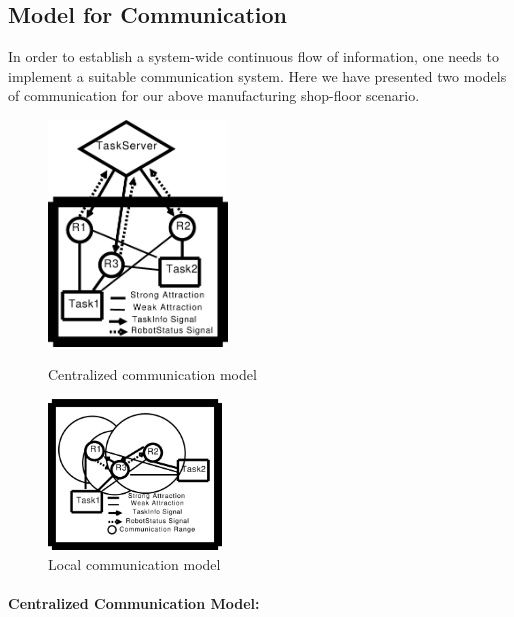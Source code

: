 \documentclass[a4paper, 10pt, conference]{ieeeconf}      %
\begin{document}
\subsection{Model for Communication}
In order to establish a system-wide continuous flow of information, one needs to implement a  suitable communication system. Here we have presented two models of communication for our above manufacturing shop-floor scenario.
%
\begin{figure}[ht]
\begin{minipage}[b]{0.55\linewidth}
\centering
\includegraphics[height=6cm, angle=0]{../dia-files/CentralizedComm.eps}
\caption{Centralized communication model}
\label{fig:ccm} %
\end{minipage}
\begin{minipage}[b]{0.45\linewidth}
\centering
\includegraphics[height=4cm, angle=0]{../dia-files/LocalComm.eps}
\caption{Local communication model}
\label{fig:lcm} %
\end{minipage}
\end{figure}
%
\paragraph{Centralized Communication Model:}
\end{document}
